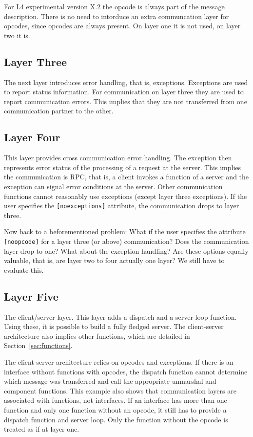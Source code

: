 For L4 experimental version X.2 the opcode is always part of the message
description.  There is no need to intorduce an extra communcation layer 
for opcodes, since opcodes are always present.  On layer one it is not
used, on layer two it is.

\subsection{Layer Three}
The next layer introduces error handling, that is, exceptions.  Exceptions
are used to report status information.  For communication on layer three
they are used to report communication errors.  This implies that they are
not transferred from one communication partner to the other.

\subsection{Layer Four}
This layer provides cross communication error handling.  The exception then
represents error status of the processing of a request at the server.  This 
implies the communication is RPC, that is, a client invokes a function of a
server and the exception can signal error conditions at the server.  Other
communication functions cannot reasonably use exceptions (except layer three
exceptions).  If the user specifies the \verb|[noexceptions]| attribute,
the communication drops to layer three.

Now back to a beforementioned problem: What if the user specifies the attribute
\verb|[noopcode]| for a layer three (or above) communication?  Does the 
communication layer drop to one?  What about the exception handling?  Are these
options equally valuable, that is, are layer two to four actually one layer?
We still have to evaluate this.

\subsection{Layer Five}
The client/server layer.  This layer adds a dispatch and a server-loop function.
Using these, it is possible to build a fully fledged server.  The client-server
architecture also implies other functions, which are detailed in 
Section~\ref{sec:functions}.

The client-server architecture relies on opcodes and exceptions.  If there is an
interface without functions with opcodes, the dispatch function cannot determine
which message was transferred and call the appropriate unmarshal and component
functions.  This example also shows that communication layers are associated
with functions, not interfaces.  If an interface has more than one function and
only one function without an opcode, it still has to provide a dispatch function
and server loop.  Only the function without the opcode is treated as if at layer
one.

